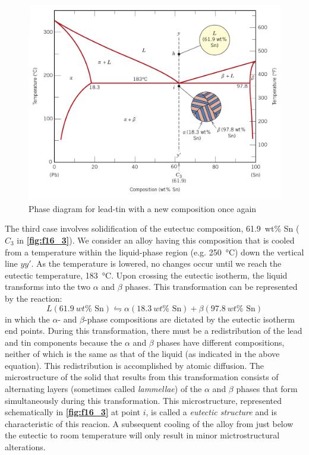 \begin{figure} [ht]
  \centering
  \includegraphics[width=0.5\linewidth]{./figures/f16_3.png}
  \caption{Phase diagram for lead-tin with a new composition once again}
  \label{fig:f16_3}
\end{figure}
The third case involves solidification of the eutectuc composition, \qty{61,9}{wt}\% Sn ($C_3$ in \textbf{\autoref{fig:f16_3}}). We consider an alloy having this composition that is cooled from a temperature within the liquid-phase region (e.g. \qty{250}{\celsius}) down the vertical line $yy'$. As the temperature is lowered, no changes occur until we reach the eutectic temperature, \qty{183}{\celsius}. Upon crossing the eutectic isotherm, the liquid transforms into the two $\alpha$ and $\beta$ phases. This transformation can be represented by the reaction:
\[ 
L(\qty{61,9}{wt}\% \text{ Sn}) \leftrightharpoons \alpha(\qty{18,3}{wt}\% \text{ Sn}) + \beta(\qty{97,8}{wt}\% \text{ Sn})
\]
in which the $\alpha$- and $\beta$-phase compositions are dictated by the eutectic isotherm end points. During this transformation, there must be a redistribution of the lead and tin components because the $\alpha$ and $\beta$ phases have different compositions, neither of which is the same as that of the liquid (as indicated in the above equation). This redistribution is accomplished by atomic diffusion. The microstructure of the solid that results from this transformation consists of alternating layers (sometimes called \textit{lammellae}) of the $\alpha$ and $\beta$ phases that form simultaneously during this transformation. This microstructure, represented schematically in \textbf{\autoref{fig:f16_3}} at point $i$, is called a \textit{eutectic structure} and is characteristic of this reacion. A subsequent cooling of the alloy from just below the eutectic to room temperature will only result in minor mictrostructural alterations.


